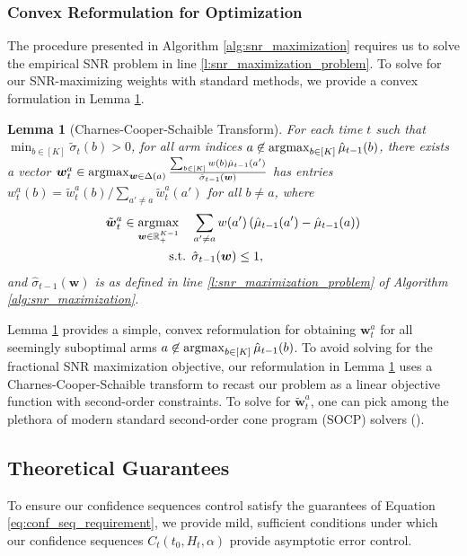 \documentclass{article}
\newtheorem{lemma}{Lemma}
\begin{document}
\subsubsection{Convex Reformulation for Optimization} The procedure presented in Algorithm \ref{alg:snr_maximization} requires us to solve the empirical SNR problem in line \ref{l:snr_maximization_problem}. To solve for our SNR-maximizing weights with standard methods, we provide a convex formulation in Lemma \ref{lem:ccs_snr}.
\begin{lemma}[Charnes-Cooper-Schaible Transform]\label{lem:ccs_snr} For each time $t$ such that $\min_{b \in [K]}\tilde\sigma_t(b) > 0$, for all arm indices $a \not\in \argmax_{b \in [K]} \hat\mu_{t-1}(b)$, there exists a vector $\bm{w}_t^a  \in \argmax_{\bm{w} \in \Delta(a)} \frac{\sum_{b \in [K]} w(b)\hat\mu_{t-1}(a') }{\hat\sigma_{t-1}(\bm{w})}$ has entries $w_t^a(b) = \tilde{{w}}_t^a(b)/\sum_{a' \neq a} \tilde{w}_t^a(a')$ for all $b \neq a$, where
\begin{align}
    {\tilde{\bm{w}}}_t^a \in \argmax_{\bm{w} \in \RR^{K-1}_+} \quad& \sum_{a' \neq a}w(a')\left(\hat\mu_{t-1}(a') - \hat\mu_{t-1}(a) \right)\\
    \text{s.t. } 
    & \hat{\sigma}_{t-1}({\bm{w}}) \leq 1,
\end{align}
and $\hat\sigma_{t-1}(\bm{w})$ is as defined in line \ref{l:snr_maximization_problem} of Algorithm \ref{alg:snr_maximization}. 
\end{lemma}
Lemma \ref{lem:ccs_snr} provides a simple, convex reformulation for obtaining $\bm{w}_t^a$ for all seemingly suboptimal arms $a \not\in \argmax_{b \in [K]}\hat\mu_{t-1}(b)$. To avoid solving for the fractional SNR maximization objective, our reformulation in Lemma \ref{lem:ccs_snr} uses a Charnes-Cooper-Schaible transform \citep{charnes_cooper} to recast our problem as a linear objective function with second-order constraints. To solve for $\tilde{\bm{w}}_t^a$, one can pick among the plethora of modern standard second-order cone program (SOCP) solvers (\cite{MOSEK, diamond2016cvxpy}). 

\subsection{Theoretical Guarantees}

To ensure our confidence sequences control satisfy the guarantees of Equation \eqref{eq:conf_seq_requirement}, we provide mild, sufficient conditions under which our confidence sequences $C_t(t_0, H_t, \alpha)$ provide asymptotic error control. 
\end{document}
